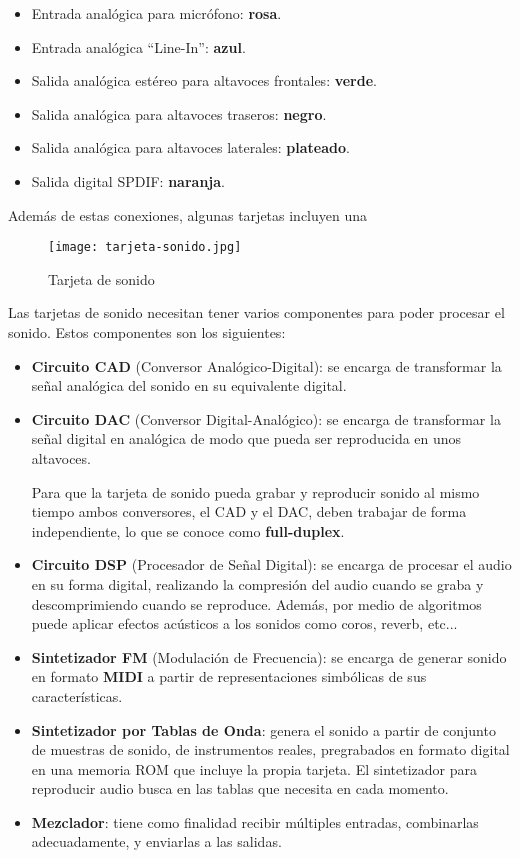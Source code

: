 \begin{itemize}
    \item Entrada analógica para micrófono: \textbf{rosa}.
    \item Entrada analógica ``Line-In'': \textbf{azul}.
    \item Salida analógica estéreo para altavoces frontales: \textbf{verde}.
    \item Salida analógica para altavoces traseros: \textbf{negro}.
    \item Salida analógica para altavoces laterales: \textbf{plateado}.
    \item Salida digital SPDIF: \textbf{naranja}.
\end{itemize}

Además de estas conexiones, algunas tarjetas incluyen una

\begin{figure}[ht]
    \centering
    \texttt{[image: tarjeta-sonido.jpg]}
    \caption{Tarjeta de sonido}
\end{figure}

Las tarjetas de sonido necesitan tener varios componentes para poder procesar el sonido. Estos componentes son los siguientes:

\begin{itemize}
    \item \textbf{Circuito CAD} (Conversor Analógico-Digital): se encarga de transformar la señal analógica del sonido en su equivalente digital.
    \item \textbf{Circuito DAC} (Conversor Digital-Analógico): se encarga de transformar la señal digital en analógica de modo que pueda ser reproducida en unos altavoces.

    Para que la tarjeta de sonido pueda grabar y reproducir sonido al mismo tiempo ambos conversores, el CAD y el DAC, deben trabajar de forma independiente, lo que se conoce como \textbf{full-duplex}.

    \item \textbf{Circuito DSP} (Procesador de Señal Digital): se encarga de procesar el audio en su forma digital, realizando la compresión del audio cuando se graba y descomprimiendo cuando se reproduce. Además, por medio de algoritmos puede aplicar efectos acústicos  a los sonidos como coros, reverb, etc...

    \item \textbf{Sintetizador FM} (Modulación de Frecuencia): se encarga de generar sonido en formato \textbf{\gls{MIDI}} a partir de representaciones simbólicas de sus características.

    \item \textbf{Sintetizador por Tablas de Onda}: genera el sonido a partir de conjunto de muestras de sonido, de instrumentos reales, pregrabados en formato digital en una memoria ROM que incluye la propia tarjeta. El sintetizador para reproducir audio busca en las tablas que necesita en cada momento.

    \item \textbf{Mezclador}: tiene como finalidad recibir múltiples entradas, combinarlas adecuadamente, y enviarlas a las salidas.
\end{itemize}

